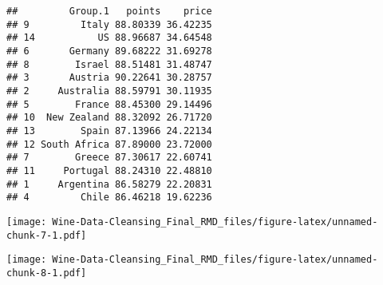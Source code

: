 \documentclass[
]{article}
\newenvironment{Shaded}{\begin{snugshade}}{\end{snugshade}}
\newcommand{\DataTypeTok}[1]{\textcolor[rgb]{0.13,0.29,0.53}{#1}}
\newcommand{\KeywordTok}[1]{\textcolor[rgb]{0.13,0.29,0.53}{\textbf{#1}}}
\newcommand{\NormalTok}[1]{#1}
\newcommand{\OperatorTok}[1]{\textcolor[rgb]{0.81,0.36,0.00}{\textbf{#1}}}
\newcommand{\StringTok}[1]{\textcolor[rgb]{0.31,0.60,0.02}{#1}}
\begin{document}
\begin{verbatim}
##         Group.1   points    price
## 9         Italy 88.80339 36.42235
## 14           US 88.96687 34.64548
## 6       Germany 89.68222 31.69278
## 8        Israel 88.51481 31.48747
## 3       Austria 90.22641 30.28757
## 2     Australia 88.59791 30.11935
## 5        France 88.45300 29.14496
## 10  New Zealand 88.32092 26.71720
## 13        Spain 87.13966 24.22134
## 12 South Africa 87.89000 23.72000
## 7        Greece 87.30617 22.60741
## 11     Portugal 88.24310 22.48810
## 1     Argentina 86.58279 22.20831
## 4         Chile 86.46218 19.62236
\end{verbatim}

\begin{Shaded}
\end{Shaded}

\texttt{[image: Wine-Data-Cleansing\_Final\_RMD\_files/figure-latex/unnamed-chunk-7-1.pdf]}

\begin{Shaded}
\end{Shaded}

\texttt{[image: Wine-Data-Cleansing\_Final\_RMD\_files/figure-latex/unnamed-chunk-8-1.pdf]}

\begin{Shaded}
\end{Shaded}
\end{document}
